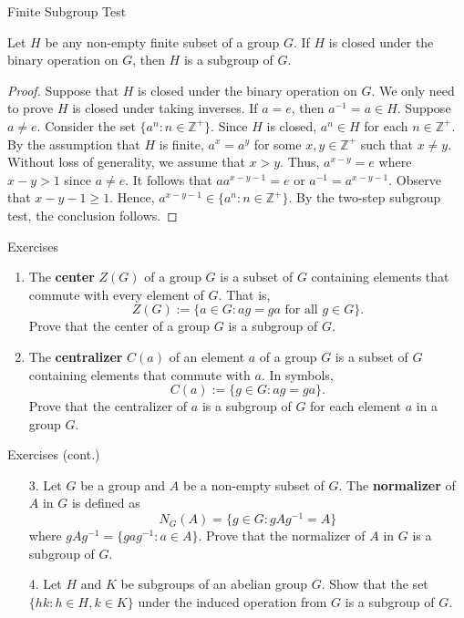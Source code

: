 \documentclass{beamer}
\begin{document}
\begin{frame}{Finite Subgroup Test}
\begin{theorem}
\justifying
Let $H$ be any non-empty finite subset of a group $G$. If $H$ is closed under the binary operation on $G$, then $H$ is a subgroup of $G$.
\end{theorem}    
\pause
\begin{proof}
\justifying
Suppose that $H$ is closed under the binary operation on $G$. We only need to prove $H$ is closed under taking inverses. If $a = e$, then $a^{-1} = a \in H$. Suppose $a \neq e$. Consider the set $\{a^n: n \in \mathbb{Z}^+\}$. Since $H$ is closed, $a^n \in H$ for each $n \in \mathbb{Z}^+$. By the assumption that $H$ is finite, $a^x = a^y$ for some $x, y \in \mathbb{Z}^+$ such that $x \neq y$. Without loss of generality, we assume that $x > y$. Thus, $a^{x - y} = e$ where $x - y > 1$ since $a \neq e$. It follows that $aa^{x - y - 1} = e$ or $a^{-1} = a^{x - y - 1}$. Observe that $x - y - 1 \geq 1$. Hence, $a^{x - y - 1} \in \{a^n: n \in \mathbb{Z}^+\}$. By the two-step subgroup test, the conclusion follows.
\end{proof}
\end{frame}

\begin{frame}{Exercises}
\begin{enumerate}
\justifying
\item The \textbf{center} $Z(G)$ of a group $G$ is a subset of $G$ containing elements that commute with every element of $G$. That is,
\[
Z(G) := \{a \in G : ag = ga \text{ for all } g \in G\}. 
\]
Prove that the center of a group $G$ is a subgroup of $G$.
\item The \textbf{centralizer} $C(a)$ of an element $a$ of a group $G$ is a subset of $G$ containing elements that commute with $a$. In symbols,
\[
C(a) := \{g \in G : ag = ga\}. 
\]
Prove that the centralizer of $a$ is a subgroup of $G$ for each element $a$ in a group $G$.
\end{enumerate}
\end{frame}

\begin{frame}{Exercises (cont.)}
\begin{enumerate}
\justifying
\item[3. ] Let $G$ be a group and $A$ be a non-empty subset of $G$. The \textbf{normalizer} of $A$ in $G$ is defined as
\[
N_G(A) = \{g \in G: gAg^{-1} = A\}
\]
where $gAg^{-1} = \{gag^{-1}: a \in A\}$. Prove that the normalizer of $A$ in $G$ is a subgroup of $G$.
\item[4. ] Let $H$ and $K$ be subgroups of an abelian group $G$. Show that the set $\{hk: h \in H, k \in K\}$ under the induced operation from $G$ is a subgroup of $G$.
\end{enumerate}
\end{frame}
\end{document}
